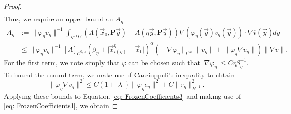 \documentclass[a4paper,reqno]{amsart}
\numberwithin{equation}{section}
\numberwithin{equation}{section}		%
\numberwithin{figure}{section}			%
\numberwithin{table}{section}				%
\theoremstyle{definition}
\newcommand{\<}{\ensuremath \leq}
\renewcommand{\>}{\ensuremath \geq}
\begin{document}
\begin{proof}
\begin{equation}
\begin{aligned}
        \end{aligned}
    \end{equation}
    Thus, we require an upper bound on $A_\eta$
    \begin{equation}\label{eq: FrozenCoefficients3}
        \begin{aligned}
            A_\eta&:=\lVert \varphi_\eta v_\eta\rVert^{-1}\int_{\eta^{-1}\Omega}\left(A\left( \vec{x}_0, \textbf{P}\vec{y}\right)-A\left( \eta\vec{y}, \textbf{P}\vec{y}\right)\right)\nabla  (\varphi_\eta(\vec{y})v_\eta(\vec{y})) \cdot \nabla \overline{v}(\vec{y})dy\\
            &\leq \lVert \varphi_\eta v_\eta\rVert^{-1}[A]_{\mathcal{C}^{0,\alpha}}(\beta_\eta + \lvert \vec{x}_{i(\eta)}^\eta-\vec{x}_0\rvert)^\alpha(\lVert \nabla \varphi_\eta \rVert_{L^\infty}\lVert v_\eta\rVert + \lVert \varphi_\eta \nabla v_\eta\rVert)\lVert\nabla  v\rVert.
        \end{aligned}
    \end{equation}
    For the first term, we note simply that $\varphi$ can be chosen such that $\lvert \nabla \varphi_\eta\rvert \leq C\eta\beta_\eta^{-1}$. To bound the second term, we make use of Caccioppoli's inequality to obtain 
    \begin{equation}
        \lVert \varphi_\eta \nabla v_\eta \rVert^2 \leq C(1 + \lvert \lambda\rvert) \lVert \varphi_\eta v_\eta\rVert^2 + C\lVert r_\eta\rVert_{H^{-1}}^2.   
    \end{equation}
    Applying these bounds to Equation \eqref{eq: FrozenCoefficients3} and making use of \eqref{eq: FrozenCoefficients1}, we obtain 


\end{proof}
\end{document}
